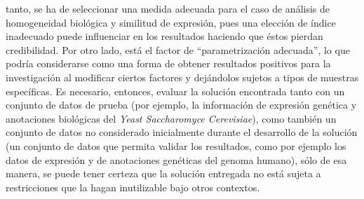 tanto, se ha de seleccionar una medida adecuada para el caso de análisis de homogeneidad biológica y similitud de expresión, pues una elección de índice inadecuado puede influenciar en los resultados haciendo que éstos pierdan credibilidad. Por otro lado, está el factor de ``parametrización adecuada'', lo que podría considerarse como una forma de obtener resultados positivos para la investigación al modificar ciertos factores y dejándolos sujetos a tipos de muestras específicas. Es necesario, entonces, evaluar la solución encontrada tanto con un conjunto de datos de prueba (por ejemplo, la información de expresión genética y anotaciones biológicas del \textit{Yeast Saccharomyce Cerevisiae}), como también un conjunto de datos no considerado inicialmente durante el desarrollo de la solución (un conjunto de datos que permita validar los resultados, como por ejemplo los datos de expresión y de anotaciones genéticas del genoma humano), sólo de esa manera, se puede tener certeza que la solución entregada no está sujeta a restricciones que la hagan inutilizable bajo otros contextos.

